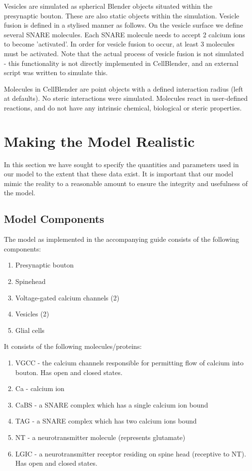 \documentclass[a4paper]{article}
\begin{document}
Vesicles are simulated as spherical Blender objects situated within the presynaptic bouton. These are also static objects within the simulation. Vesicle fusion is defined in a stylised manner as follows. On the vesicle surface we define several SNARE molecules. Each SNARE molecule needs to accept 2 calcium ions to become 'activated'. In order for vesicle fusion to occur, at least 3 molecules must be activated. Note that the actual process of vesicle fusion is not simulated - this functionality is not directly implemented in CellBlender, and an external script was written to simulate this.

Molecules in CellBlender are point objects with a defined interaction radius (left at defaults). No steric interactions were simulated. Molecules react in user-defined reactions, and do not have any intrinsic chemical, biological or steric properties. 

\section{Making the Model Realistic}
In this section we have sought to specify the quantities and parameters used in our model to the extent that these data exist. It is important that our model mimic the reality to a reasonable amount to ensure the integrity and usefulness of the model.

\subsection{Model Components}
The model as implemented in the accompanying guide consists of the following components:
\begin{enumerate} 
    \item Presynaptic bouton
    \item Spinehead
    \item Voltage-gated calcium channels (2)
    \item Vesicles (2)
    \item Glial cells
\end{enumerate}

It consists of the following molecules/proteins:
\begin{enumerate}
    \item VGCC - the calcium channels responsible for permitting flow of calcium into bouton. Has open and closed states.
    \item Ca - calcium ion
    \item CaBS - a SNARE complex which has a single calcium ion bound
    \item TAG - a SNARE complex which has two calcium ions bound
    \item NT - a neurotransmitter molecule (represents glutamate)
    \item LGIC - a neurotransmitter receptor residing on spine head (receptive to NT). Has open and closed states.
\end{enumerate}
\end{document}
